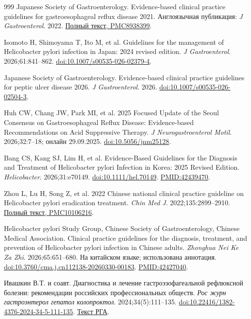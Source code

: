 \documentclass[11pt,a4paper,notitlepage]{report}
\begin{document}
\begin{thebibliography}{999}
 Japanese Society of Gastroenterology. Evidence-based clinical practice guidelines for gastroesophageal reflux disease 2021. Англоязычная публикация: \textit{J Gastroenterol}. 2022. \href{https://pmc.ncbi.nlm.nih.gov/articles/8938399/}{Полный текст, PMC8938399}.

 Isomoto H, Shimoyama T, Ito M, et al. Guidelines for the management of Helicobacter pylori infection in Japan: 2024 revised edition. \textit{J Gastroenterol}. 2026;61:841--862. \href{https://doi.org/10.1007/s00535-026-02379-4}{doi:10.1007/s00535-026-02379-4}.

 Japanese Society of Gastroenterology. Evidence-based clinical practice guidelines for peptic ulcer disease 2026. \textit{J Gastroenterol}. 2026. \href{https://doi.org/10.1007/s00535-026-02504-3}{doi:10.1007/s00535-026-02504-3}.

 Huh CW, Chang JW, Park MI, et al. 2025 Focused Update of the Seoul Consensus on Gastroesophageal Reflux Disease: Evidence-based Recommendations on Acid Suppressive Therapy. \textit{J Neurogastroenterol Motil}. 2026;32:7--18; онлайн 29.09.2025. \href{https://doi.org/10.5056/jnm25128}{doi:10.5056/jnm25128}.

 Bang CS, Kang SJ, Lim H, et al. Evidence-Based Guidelines for the Diagnosis and Treatment of Helicobacter pylori Infection in Korea: 2025 Revised Edition. \textit{Helicobacter}. 2026;31:e70149. \href{https://doi.org/10.1111/hel.70149}{doi:10.1111/hel.70149}. \href{https://pubmed.ncbi.nlm.nih.gov/42439470/}{PMID:42439470}.

 Zhou L, Lu H, Song Z, et al. 2022 Chinese national clinical practice guideline on Helicobacter pylori eradication treatment. \textit{Chin Med J}. 2022;135:2899--2910. \href{https://pmc.ncbi.nlm.nih.gov/articles/PMC10106216/}{Полный текст, PMC10106216}.

 Helicobacter pylori Study Group, Chinese Society of Gastroenterology, Chinese Medical Association. Clinical practice guidelines for the diagnosis, treatment, and prevention of Helicobacter pylori infection in Chinese adults. \textit{Zhonghua Nei Ke Za Zhi}. 2026;65:651--680. На китайском языке; использована аннотация. \href{https://doi.org/10.3760/cma.j.cn112138-20260330-00183}{doi:10.3760/cma.j.cn112138-20260330-00183}. \href{https://pubmed.ncbi.nlm.nih.gov/42427040/}{PMID:42427040}.

 Ивашкин В.Т. и соавт. Диагностика и лечение гастроэзофагеальной рефлюксной болезни: рекомендации российских профессиональных обществ. \textit{Рос журн гастроэнтерол гепатол колопроктол}. 2024;34(5):111--135. \href{https://doi.org/10.22416/1382-4376-2024-34-5-111-135}{doi:10.22416/1382-4376-2024-34-5-111-135}. \href{https://www.gastro.ru/userfiles/R_GERB2024.pdf}{Текст РГА}.


\end{thebibliography}
\end{document}
